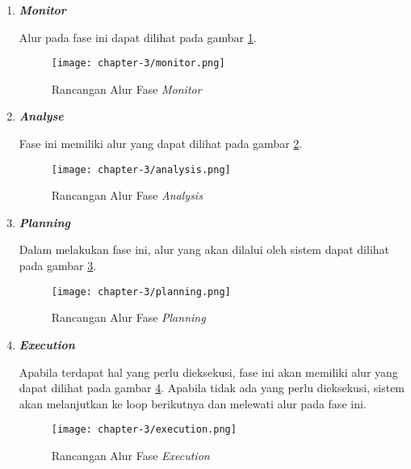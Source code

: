\begin{enumerate}
    \item \bfseries \textit{Monitor} \normalfont
    
        Alur pada fase ini dapat dilihat pada gambar \ref{fig:alur-monitor}.

        \begin{figure}[h]
            \centering
            \texttt{[image: chapter-3/monitor.png]}
            \caption{Rancangan Alur Fase \textit{Monitor}}
            \label{fig:alur-monitor}
        \end{figure}
        
    \item \bfseries \textit{Analyse} \normalfont
    
        Fase ini memiliki alur yang dapat dilihat pada gambar \ref{fig:alur-analysis}.

        \begin{figure}[h]
            \centering
            \texttt{[image: chapter-3/analysis.png]}
            \caption{Rancangan Alur Fase \textit{Analysis}}
            \label{fig:alur-analysis}
        \end{figure}
        
    \item \bfseries \textit{Planning} \normalfont
    
        Dalam melakukan fase ini, alur yang akan dilalui oleh sistem dapat dilihat pada gambar \ref{fig:alur-planning}.

        \begin{figure}[h]
            \centering
            \texttt{[image: chapter-3/planning.png]}
            \caption{Rancangan Alur Fase \textit{Planning}}
            \label{fig:alur-planning}
        \end{figure}

    \item \bfseries \textit{Execution} \normalfont
    
        Apabila terdapat hal yang perlu dieksekusi, fase ini akan memiliki alur yang dapat dilihat pada gambar \ref{fig:alur-execution}. Apabila tidak ada yang perlu dieksekusi, sistem akan melanjutkan ke loop berikutnya dan melewati alur pada fase ini.

        \begin{figure}[h]
            \centering
            \texttt{[image: chapter-3/execution.png]}
            \caption{Rancangan Alur Fase \textit{Execution}}
            \label{fig:alur-execution}
        \end{figure}
\end{enumerate}

